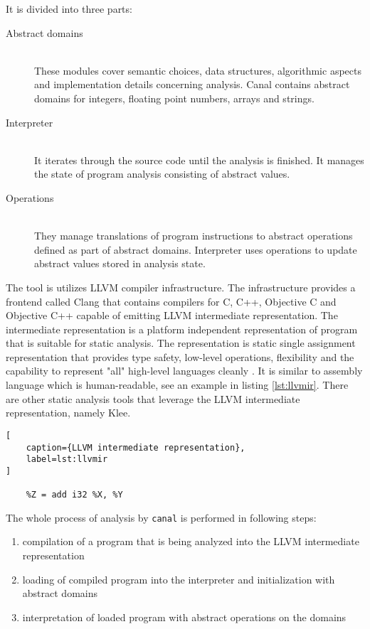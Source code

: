 \documentclass[12pt,final,oneside]{fithesis2}
\theoremstyle{definition}
\begin{document}
It is divided into three parts:

\begin{description}

\item[Abstract domains] \hfill \\
These modules cover semantic choices, data
structures, algorithmic aspects and implementation details concerning
analysis. Canal contains abstract domains for integers, floating point
numbers, arrays and strings.

\item[Interpreter] \hfill \\
It iterates through the source code until the analysis
is finished. It manages the state of program analysis consisting of
abstract values.

\item[Operations] \hfill \\
They manage translations of program instructions to
abstract operations defined as part of abstract domains. Interpreter uses
operations to update abstract values stored in analysis state.

\end{description}

The tool is utilizes LLVM compiler infrastructure. The infrastructure
provides a frontend called Clang that contains compilers for C, C++,
Objective C and Objective C++ capable of emitting LLVM intermediate
representation. The intermediate representation is a platform independent
representation of program that is suitable for static analysis.
The representation is static single assignment representation that provides
type safety, low-level operations, flexibility and the capability to
represent "all" high-level languages cleanly \cite{llvm13-1}. It is similar
to assembly language which is human-readable, see an example in
listing \ref{lst:llvmir}. There are other static analysis tools that leverage
the LLVM intermediate representation, namely Klee.

\begin{lstlisting}[
    caption={LLVM intermediate representation},
    label=lst:llvmir
]

    %Z = add i32 %X, %Y

\end{lstlisting}

The whole process of analysis by \texttt{canal} is performed in following
steps:

\begin{enumerate}

\item compilation of a program that is being analyzed into the LLVM
intermediate representation

\item loading of compiled program into the interpreter and initialization
with abstract domains

\item interpretation of loaded program with abstract operations on the
domains

\end{enumerate}
\end{document}
